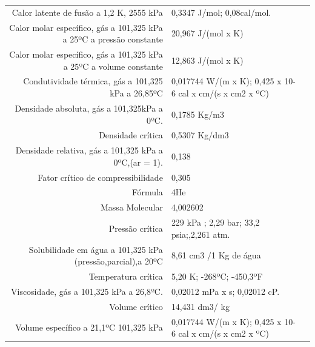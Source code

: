 \begin{table}[h]
\begin{tabular}{r|lr}
Calor latente de fusão a 1,2 K, 2555 kPa & 0,3347 J/mol; 0,08cal/mol.\\
Calor molar específico, gás a 101,325 kPa a 25ºC a pressão constante & 20,967 J/(mol x K) \\ 
Calor molar específico, gás a 101,325 kPa a 25ºC a volume constante  & 12,863 J/(mol x K)                                       \\
Condutividade térmica, gás a 101,325 kPa a 26,85ºC                   & 0,017744 W/(m x K); 0,425 x 10-6 cal x cm/(s x cm2 x ºC) \\
Densidade absoluta, gás a 101,325kPa a 0ºC.                          & 0,1785 Kg/m3                                             \\
Densidade crítica                                                    & 0,5307 Kg/dm3                                            \\
Densidade relativa, gás a 101,325 kPa a 0ºC,(ar = 1).                & 0,138                                                    \\
Fator crítico de compressibilidade                                   & 0,305                                                    \\
Fórmula                                                              & 4He                                                      \\
Massa Molecular                                                      & 4,002602                                                 \\
Pressão crítica                                                      & 229 kPa ; 2,29 bar; 33,2 psia;,2,261 atm.                \\
Solubilidade em água a 101,325 kPa (pressão,parcial),a 20ºC          & 8,61 cm3 /1 Kg de água                                   \\
Temperatura crítica                                                  & 5,20 K; -268ºC; -450,3ºF                                 \\
Viscosidade, gás a 101,325 kPa a 26,8ºC.                             & 0,02012 mPa x s; 0,02012 cP.                             \\
Volume crítico                                                       & 14,431 dm3/ kg                                           \\
Volume específico a 21,1ºC 101,325 kPa                               & 0,017744 W/(m x K); 0,425 x 10-6 cal x cm/(s x cm2 x ºC)
\hline
\end{tabular}
\end{table}

